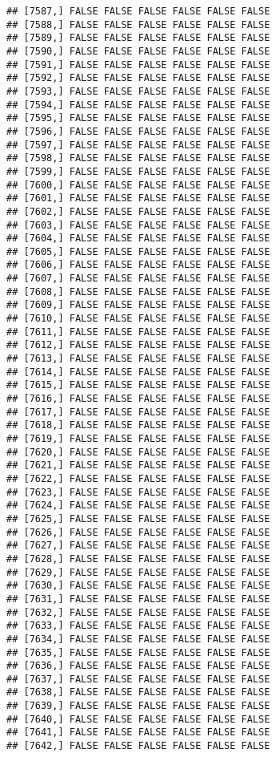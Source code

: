 \documentclass[
]{article}
\begin{document}
\begin{verbatim}
## [7587,] FALSE FALSE FALSE FALSE FALSE FALSE
## [7588,] FALSE FALSE FALSE FALSE FALSE FALSE
## [7589,] FALSE FALSE FALSE FALSE FALSE FALSE
## [7590,] FALSE FALSE FALSE FALSE FALSE FALSE
## [7591,] FALSE FALSE FALSE FALSE FALSE FALSE
## [7592,] FALSE FALSE FALSE FALSE FALSE FALSE
## [7593,] FALSE FALSE FALSE FALSE FALSE FALSE
## [7594,] FALSE FALSE FALSE FALSE FALSE FALSE
## [7595,] FALSE FALSE FALSE FALSE FALSE FALSE
## [7596,] FALSE FALSE FALSE FALSE FALSE FALSE
## [7597,] FALSE FALSE FALSE FALSE FALSE FALSE
## [7598,] FALSE FALSE FALSE FALSE FALSE FALSE
## [7599,] FALSE FALSE FALSE FALSE FALSE FALSE
## [7600,] FALSE FALSE FALSE FALSE FALSE FALSE
## [7601,] FALSE FALSE FALSE FALSE FALSE FALSE
## [7602,] FALSE FALSE FALSE FALSE FALSE FALSE
## [7603,] FALSE FALSE FALSE FALSE FALSE FALSE
## [7604,] FALSE FALSE FALSE FALSE FALSE FALSE
## [7605,] FALSE FALSE FALSE FALSE FALSE FALSE
## [7606,] FALSE FALSE FALSE FALSE FALSE FALSE
## [7607,] FALSE FALSE FALSE FALSE FALSE FALSE
## [7608,] FALSE FALSE FALSE FALSE FALSE FALSE
## [7609,] FALSE FALSE FALSE FALSE FALSE FALSE
## [7610,] FALSE FALSE FALSE FALSE FALSE FALSE
## [7611,] FALSE FALSE FALSE FALSE FALSE FALSE
## [7612,] FALSE FALSE FALSE FALSE FALSE FALSE
## [7613,] FALSE FALSE FALSE FALSE FALSE FALSE
## [7614,] FALSE FALSE FALSE FALSE FALSE FALSE
## [7615,] FALSE FALSE FALSE FALSE FALSE FALSE
## [7616,] FALSE FALSE FALSE FALSE FALSE FALSE
## [7617,] FALSE FALSE FALSE FALSE FALSE FALSE
## [7618,] FALSE FALSE FALSE FALSE FALSE FALSE
## [7619,] FALSE FALSE FALSE FALSE FALSE FALSE
## [7620,] FALSE FALSE FALSE FALSE FALSE FALSE
## [7621,] FALSE FALSE FALSE FALSE FALSE FALSE
## [7622,] FALSE FALSE FALSE FALSE FALSE FALSE
## [7623,] FALSE FALSE FALSE FALSE FALSE FALSE
## [7624,] FALSE FALSE FALSE FALSE FALSE FALSE
## [7625,] FALSE FALSE FALSE FALSE FALSE FALSE
## [7626,] FALSE FALSE FALSE FALSE FALSE FALSE
## [7627,] FALSE FALSE FALSE FALSE FALSE FALSE
## [7628,] FALSE FALSE FALSE FALSE FALSE FALSE
## [7629,] FALSE FALSE FALSE FALSE FALSE FALSE
## [7630,] FALSE FALSE FALSE FALSE FALSE FALSE
## [7631,] FALSE FALSE FALSE FALSE FALSE FALSE
## [7632,] FALSE FALSE FALSE FALSE FALSE FALSE
## [7633,] FALSE FALSE FALSE FALSE FALSE FALSE
## [7634,] FALSE FALSE FALSE FALSE FALSE FALSE
## [7635,] FALSE FALSE FALSE FALSE FALSE FALSE
## [7636,] FALSE FALSE FALSE FALSE FALSE FALSE
## [7637,] FALSE FALSE FALSE FALSE FALSE FALSE
## [7638,] FALSE FALSE FALSE FALSE FALSE FALSE
## [7639,] FALSE FALSE FALSE FALSE FALSE FALSE
## [7640,] FALSE FALSE FALSE FALSE FALSE FALSE
## [7641,] FALSE FALSE FALSE FALSE FALSE FALSE
## [7642,] FALSE FALSE FALSE FALSE FALSE FALSE

\end{verbatim}
\end{document}
